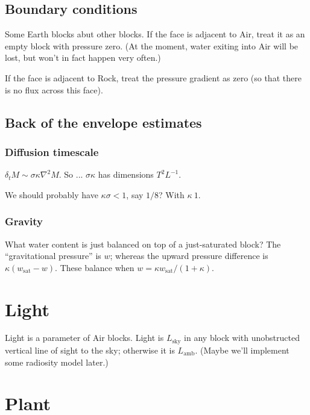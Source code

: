 \documentclass[10pt, a4paper, twocolumn]{article}
\begin{document}
\subsection{Boundary conditions}\label{sec:boundary}

Some Earth blocks abut other blocks. If the face is adjacent to Air,
treat it as an empty block with pressure zero. (At the moment, water
exiting into Air will be lost, but won't in fact happen very often.)

If the face is adjacent to Rock, treat the pressure gradient as zero
(so that there is no flux across this face).

\subsection{Back of the envelope estimates}

\subsubsection{Diffusion timescale}

$\delta_t M \sim \sigma \kappa \nabla^2 M$. So ... $\sigma\kappa$ has dimensions $T^2 L^{-1}$.  

We should probably have $\kappa\sigma < 1 $, say $1/8$? With $\kappa~1$.

\subsubsection{Gravity}

What water content is just balanced on top of a just-saturated block?
The ``gravitational pressure'' is $w$; whereas the upward pressure
difference is $\kappa(w_\text{sat} - w)$. These balance when $w = \kappa
w_\text{sat} / (1+\kappa)$. 



\section{Light}

Light is a parameter of Air blocks. Light is $L_{\text{sky}}$ in any
block with unobstructed vertical line of sight to the sky; otherwise
it is $L_{\text{amb}}$. (Maybe we'll implement some radiosity model
later.)

\section{Plant}
\end{document}
